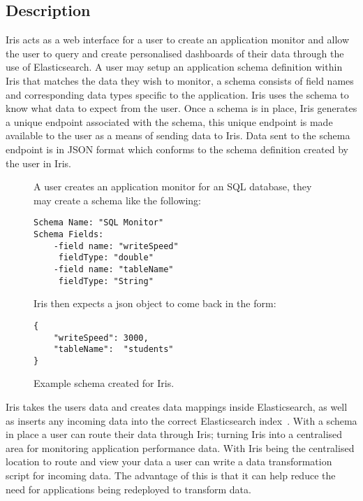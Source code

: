 \documentclass[12pt,a4paper,titlepage]{report}
\begin{document}
\subsection{Description}
Iris acts as a web interface for a user to create an application monitor and allow the user to query and create personalised dashboards of their data through the use of Elasticsearch. A user may setup an application schema definition within Iris that matches the data they wish to monitor, a schema consists of field names and corresponding data types specific to the application. Iris uses the schema to know what data to expect from the user. Once a schema is in place, Iris generates a unique endpoint associated with the schema, this unique endpoint is made available to the user as a means of sending data to Iris. Data sent to the schema endpoint is in JSON format which conforms to the schema definition created by the user in Iris.
\begin{figure}[H]
\begin{tcolorbox}
A user creates an application monitor for an SQL database, they may create a schema like the following:
\begin{verbatim}
Schema Name: "SQL Monitor"
Schema Fields:
    -field name: "writeSpeed"
     fieldType: "double"
    -field name: "tableName"
     fieldType: "String"
\end{verbatim}
Iris then expects a json object to come back in the form:
\begin{verbatim}
{
	"writeSpeed": 3000,
	"tableName":  "students"
}
\end{verbatim}
\end{tcolorbox}
\caption{Example schema created for Iris.}
\end{figure}

Iris takes the users data and creates data mappings \parencite{Elastic.co.Mapping} inside Elasticsearch, as well as inserts any incoming data into the correct Elasticsearch index~\parencite{Elastic.co.Basic}. With a schema in place a user can route their data through Iris; turning Iris into a centralised area for monitoring application performance data. With Iris being the centralised location to route and view your data a user can write a data transformation script for incoming data. The advantage of this is that it can help reduce the need for applications being redeployed to transform data.
\end{document}
